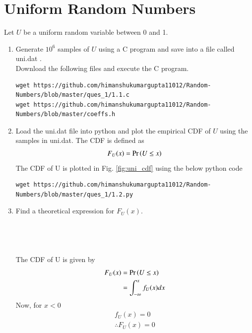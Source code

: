 \documentclass[journal,12pt,twocolumn]{IEEEtran}
\renewcommand\thesection{\arabic{section}}
\begin{document}
	\section{Uniform Random Numbers}
	Let $U$ be a uniform random variable between 0 and 1.
	\begin{enumerate}[label=\thesection.\arabic*
		,ref=\thesection.\theenumi]
		\item Generate $10^6$ samples of $U$ using a C program and save into a file called uni.dat .
		\\
		\solution Download the following files and execute the  C program.
		\begin{lstlisting}
wget https://github.com/himanshukumargupta11012/Random-Numbers/blob/master/ques_1/1.1.c
wget https://github.com/himanshukumargupta11012/Random-Numbers/blob/master/coeffs.h
		\end{lstlisting}
		\item
		Load the uni.dat file into python and plot the empirical CDF of $U$ using the samples in uni.dat. The CDF is defined as
		\begin{align}
			F_{U}(x) = \Pr\left(U \le x\right)
		\end{align}
		\solution The CDF of U is plotted in Fig. \ref{fig:uni_cdf}
		using the below python code
		\begin{lstlisting}
wget https://github.com/himanshukumargupta11012/Random-Numbers/blob/master/ques_1/1.2.py
		\end{lstlisting}
		\item
		Find a  theoretical expression for $F_{U}(x)$.
		\\
		\\
		\\
		\\
		\\
		
		\solution 
		The CDF of U is given by
		\begin{align}
			F_U(x)&=\Pr\left( U\leq x\right)\\
			&=\int_{-\infty}^x f_U(x)dx\\
		\end{align}
		Now, for $x<0$
		\begin{align}
			f_U(x)=0\\
			\therefore F_U(x)=0
		\end{align}
		

\end{enumerate}
\end{document}

